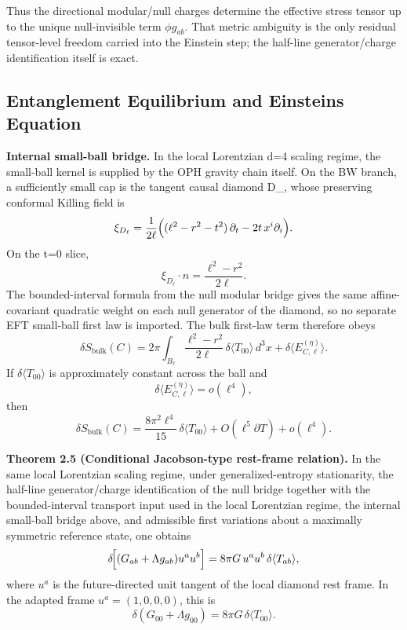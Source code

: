 Thus the directional modular/null charges determine the effective stress tensor up to the unique null-invisible term \(\phi g_{ab}\). That metric ambiguity is the only residual tensor-level freedom carried into the Einstein step; the half-line generator/charge identification itself is exact.

\subsection{Entanglement Equilibrium and Einstein\textquotesingle s Equation}\label{25-entanglement-equilibrium-and-einsteins-equation}

\textbf{Internal small-ball bridge.} In the local Lorentzian d=4 scaling regime, the small-ball kernel is supplied by the OPH gravity chain itself. On the BW branch, a sufficiently small cap is the tangent causal diamond D_\ell, whose preserving conformal Killing field is
\[
\xi_{D_\ell}
=
\frac{1}{2\ell}
\Bigl((\ell^2-r^2-t^2)\,\partial_t-2t\,x^i\partial_i\Bigr).
\]
On the t=0 slice,
\[
\xi_{D_\ell}\!\cdot n=\frac{\ell^2-r^2}{2\ell}.
\]
The bounded-interval formula from the null modular bridge gives the same affine-covariant quadratic weight on each null generator of the diamond, so no separate EFT small-ball first law is imported. The bulk first-law term therefore obeys
\[
\delta S_{\mathrm{bulk}}(C)
=
2\pi\int_{B_\ell}\frac{\ell^2-r^2}{2\ell}\,\delta\langle T_{00}\rangle\,d^3x
+
\delta\langle E^{(\eta)}_{C,\ell}\rangle.
\]
If \(\delta\langle T_{00}\rangle\) is approximately constant across the ball and
\[
\delta\langle E^{(\eta)}_{C,\ell}\rangle=o(\ell^4),
\]
then
\[
\delta S_{\mathrm{bulk}}(C)
=
\frac{8\pi^2\ell^4}{15}\,\delta\langle T_{00}\rangle
+O(\ell^5\partial T)+o(\ell^4).
\]

\textbf{Theorem 2.5 (Conditional Jacobson-type rest-frame relation).} In the same local Lorentzian scaling regime, under generalized-entropy stationarity, the half-line generator/charge identification of the null bridge together with the bounded-interval transport input used in the local Lorentzian regime, the internal small-ball bridge above, and admissible first variations about a maximally symmetric reference state, one obtains
\[
\delta\!\Bigl[(G_{ab}+\Lambda g_{ab})u^a u^b\Bigr]
=
8\pi G\,u^a u^b\,\delta\langle T_{ab}\rangle,
\]
where \(u^a\) is the future-directed unit tangent of the local diamond rest frame. In the adapted frame \(u^a=(1,0,0,0)\), this is
\[
\delta\!\left(G_{00}+\Lambda g_{00}\right)=8\pi G\,\delta\langle T_{00}\rangle.
\]

